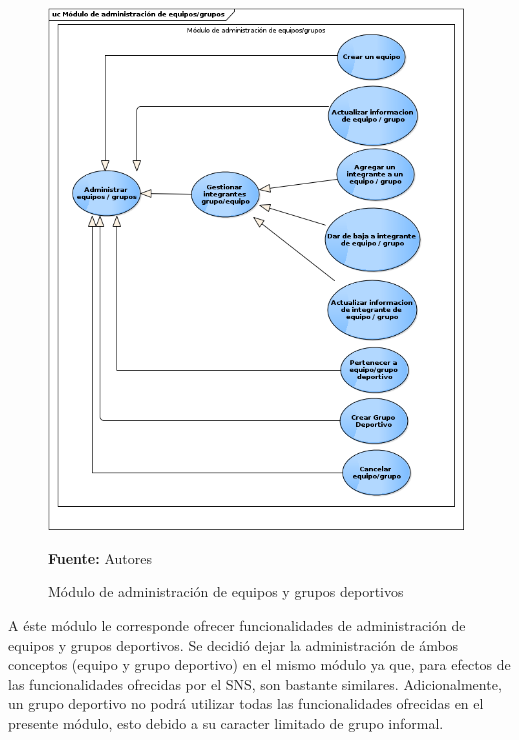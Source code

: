 \begin{figure}[!htb]
  \begin{center}
    \includegraphics[width=11cm]{./imagenes/casos_uso/gestion_equipo_grupo.png}
    \caption{Módulo de administración de equipos y grupos deportivos}
    \label{fig:cu_admin_equip_grup}
    \textbf{Fuente:} Autores
  \end{center}
\end{figure}

A éste módulo le corresponde ofrecer funcionalidades de administración de equipos y grupos deportivos. Se decidió dejar la administración de ámbos conceptos (equipo y grupo deportivo) en el mismo módulo ya que, para efectos de las funcionalidades ofrecidas por el SNS, son bastante similares. Adicionalmente, un grupo deportivo no podrá utilizar todas las funcionalidades ofrecidas en el presente módulo, esto debido a su caracter limitado de grupo informal.